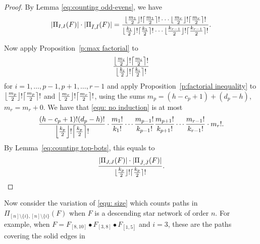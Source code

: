 \documentclass[12pt]{amsart}
\DeclarePairedDelimiter\ceil{\lceil}{\rceil}
\DeclarePairedDelimiter\floor{\lfloor}{\rfloor}
\theoremstyle{definition}
\numberwithin{equation}{section}
\begin{document}
\begin{proof}

By Lemma \ref{eq:counting odd-evens}, we have
    \begin{equation}\label{equ: no induction}
        |\Pi_{I,I}(F)  | \cdot | \Pi_{\Bar{I},\Bar{I}}(F)| =  \frac{\lfloor \frac{m_1}{2}\rfloor!\lceil \frac{m_1}{2}\rceil!\cdots \lfloor \frac{m_{r}}{2}\rfloor!\lceil\frac{m_{r}}{2}\rceil!}{\lfloor \frac{k_1}{2}\rfloor!\lceil \frac{k_1}{2}\rceil!\cdots \lfloor \frac{k_{r-1}}{2}\rfloor!\lceil\frac{k_{r-1}}{2}\rceil!}.
    \end{equation}

Now apply Proposition~\ref{p:max factorial} to \begin{equation*}\frac{\floor*{\frac{m_i}{2}}!\ceil*{\frac{m_i}{2}}!}{\floor*{\frac{k_i}{2}}!\ceil*{\frac{k_i}{2}}!}\end{equation*} for $i=1,\ldots, p-1, p+1, \ldots, r-1$ and apply Proposition~\ref{p:factorial inequality} to $\floor*{\frac{m_p}{2}}!\ceil*{\frac{m_p}{2}}!$ and $\floor*{\frac{m_r}{2}}!\ceil*{\frac{m_r}{2}}!$, using the sums $m_p=(h-c_p+1)+(d_p-h)$, $m_r=m_r+0$. We have that \eqref{equ: no induction} is at most
\begin{equation*}
        \frac{(h-c_p+1)!(d_p-h)!}{\floor*{\frac{k_p}{2}}!\ceil*{\frac{k_p}{2}}!} \cdot \frac{m_1!}{k_1!}\cdots \frac{m_{p-1}!}{k_{p-1}!}\frac{m_{p+1}!}{k_{p+1}!}\cdots \frac{m_{r-1}!}{k_{r-1}!}\cdot m_r!.
    \end{equation*}
By Lemma~\ref{eq:counting top-bots}, this equals to \begin{equation*}
        \frac{| \Pi_{J,J}(F) | \cdot | \Pi_{\Bar{J},\Bar{J}}(F)  |}{\floor{\frac{k_p}{2}}!\ceil{\frac{k_p}{2}}!}.
    \end{equation*}

\end{proof}

Now consider the variation of \eqref{equ: size} which counts paths in $\Pi_{[n]\setminus\{i\},[n]\setminus\{i\}}(F)$ when $F$ is a descending star network of order $n$. For example, when $F=F_{[8,10]}\bullet F_{[3,8]}\bullet F_{[1,5]}$ and $i =3$, these are the paths covering the solid edges in
\end{document}

